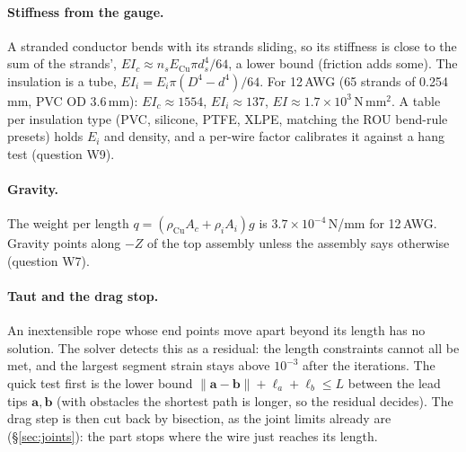 \paragraph{Stiffness from the gauge.} A stranded conductor bends with its strands sliding, so its stiffness is
close to the sum of the strands', $EI_c\approx n_s E_{\text{Cu}}\pi d_s^4/64$, a lower bound (friction adds
some). The insulation is a tube, $EI_i=E_i\pi(D^4-d^4)/64$. For 12\,AWG (65 strands of 0.254\,mm, PVC OD
3.6\,mm): $EI_c\approx1554$, $EI_i\approx137$, $EI\approx1.7\times10^3$\,N\,mm$^2$. A table per insulation type
(PVC, silicone, PTFE, XLPE, matching the ROU bend-rule presets) holds $E_i$ and density, and a per-wire factor
calibrates it against a hang test (question W9).

\paragraph{Gravity.} The weight per length $q=(\rho_{\text{Cu}}A_c+\rho_iA_i)g$ is
$3.7\times10^{-4}$\,N/mm for 12\,AWG. Gravity points along $-Z$ of the top assembly unless the assembly says
otherwise (question W7).

\paragraph{Taut and the drag stop.} An inextensible rope whose end points move apart beyond its length has no
solution. The solver detects this as a residual: the length constraints cannot all be met, and the largest
segment strain stays above $10^{-3}$ after the iterations. The quick test first is the lower bound
$\lVert\mathbf a-\mathbf b\rVert+\ell_a+\ell_b\le L$ between the lead tips $\mathbf a,\mathbf b$ (with obstacles
the shortest path is longer, so the residual decides). The drag step is then cut back by bisection, as the joint
limits already are (\S\ref{sec:joints}): the part stops where the wire just reaches its length.

